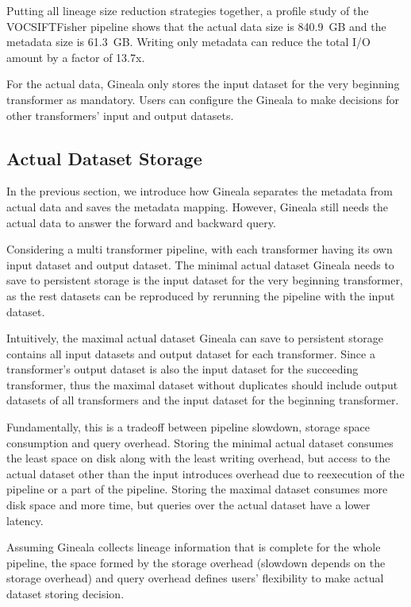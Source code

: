 \documentclass{sig-alternate}
\begin{document}
Putting all lineage size reduction strategies together, 
a profile study of the VOCSIFTFisher pipeline shows that the actual data size is 840.9~GB and the metadata size is 61.3~GB. 
Writing only metadata can reduce the total I/O amount by a factor of 13.7x.

For the actual data, Gineala only stores the input dataset for the very beginning transformer as mandatory. 
Users can configure the Gineala to make decisions for other transformers' input and output datasets.




\subsection{Actual Dataset Storage}
In the previous section, we introduce how Gineala separates the metadata from actual data and saves the metadata mapping.
However, Gineala still needs the actual data to answer the forward and backward query.

Considering a multi transformer pipeline, with each transformer having its own input dataset and output dataset.
The minimal actual dataset Gineala needs to save to persistent storage is the input dataset for the very beginning transformer, as
the rest datasets can be reproduced by rerunning the pipeline with the input dataset.

Intuitively, the maximal actual dataset Gineala can save to persistent storage contains all input datasets and output dataset for each transformer.
Since a transformer's output dataset is also the input dataset for the succeeding transformer, thus the maximal dataset without duplicates
should include output datasets of all transformers and the input dataset for the beginning transformer. 

Fundamentally, this is a tradeoff between pipeline slowdown, storage space consumption and query overhead. 
Storing the minimal actual dataset consumes the least space on disk along with the least writing overhead, 
but access to the actual dataset other than the input introduces overhead due to reexecution of the pipeline or a part of the pipeline.
Storing the maximal dataset consumes more disk space and more time, but queries over the actual dataset
have a lower latency.

Assuming Gineala collects lineage information that is complete for the whole pipeline, the space formed by the storage overhead 
(slowdown depends on the storage overhead) and query overhead defines users' flexibility to make actual dataset storing decision.
\end{document}

